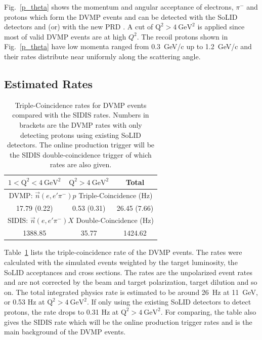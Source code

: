 Fig.~\ref{p_theta} shows the momentum and angular acceptance of electrons, $\pi^{-}$ and protons which form the DVMP events and can be detected with the SoLID detectors and (or) with the new PRD . A cut of $\mathrm{Q^{2}>4~GeV^{2}}$ is applied since most of valid DVMP events are at high $Q^{2}$. The recoil protons shown in Fig.~\ref{p_theta}  have low momenta ranged from 0.3~GeV/c up to 1.2~GeV/c and their rates distribute near uniformly along the scattering angle. 

\subsection{Estimated Rates}
\begin{table}[!ht]
\centering
\begin{tabular}{|c|c|c|}
 \hline
  $\mathrm{1<Q^{2}<4~GeV^{2}}$             &    $\mathrm{Q^{2}>4~GeV^{2}}$  & Total\\
 \hline
                  \multicolumn{3}{|c|}{DVMP: $\vec{n}(e,e'\pi^{-})p$ Triple-Coincidence (Hz)}     \\
 \hline
 17.79 (0.22)   &  0.53 (0.31) & 26.45 (7.66)   \\
 \hline
                  \multicolumn{3}{|c|}{SIDIS: $\vec{n}(e,e'\pi^{-})X$ Double-Coincidence (Hz)}                                     \\
 \hline
1388.85 & 35.77 & 1424.62   \\
 \hline
\end{tabular}
\caption[Triple-Coincidence rates for neutron-DVMP]{\footnotesize{Triple-Coincidence  rates for DVMP events compared with the SIDIS rates. Numbers in brackets are the DVMP rates with only detecting protons using existing SoLID detectors. The online production trigger will be the SIDIS double-coincidence trigger of which rates are also given.}}
\label{rate_table}
\end{table} 
Table~\ref{rate_table} lists the triple-coincidence rate of the DVMP events. The rates were calculated with the simulated events weighted by the target luminosity, the SoLID acceptances and cross sections. The rates are the unpolarized event rates and are not corrected by the beam and target polarization, target dilution and so on. The total integrated physics rate is estimated to be around 26~Hz  at 11~GeV, or  0.53 Hz at $\mathrm{Q^{2}>4~GeV^{2}}$. If only using the existing SoLID detectors to detect protons, the rate drops to 0.31 Hz at $\mathrm{Q^{2}>4~GeV^{2}}$.  For comparing,  the table also gives the SIDIS rate  which will be the online production trigger rates and is the main background of the DVMP events. 

